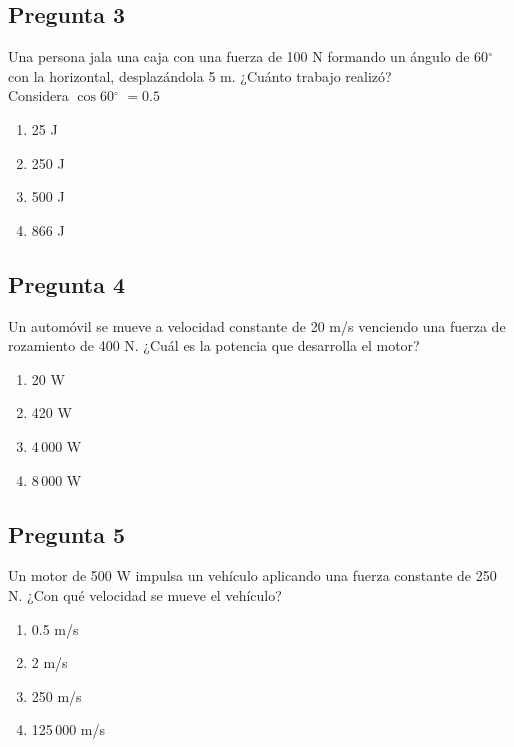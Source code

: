 \begin{preguntabox}
\subsection{Pregunta 3}
Una persona jala una caja con una fuerza de 100 N formando un ángulo de 60$^\circ$ con la horizontal, desplazándola 5 m. ¿Cuánto trabajo realizó?\\
Considera $\cos 60$$^\circ$ $= 0.5$

\begin{enumerate}
    \item[A)] 25 J
    \item[B)] 250 J
    \item[C)] 500 J
    \item[D)] 866 J
\end{enumerate}
\end{preguntabox}
\newpage
\begin{preguntabox}
\subsection{Pregunta 4}
Un automóvil se mueve a velocidad constante de 20 m/s venciendo una fuerza de rozamiento de 400 N. ¿Cuál es la potencia que desarrolla el motor?

\begin{enumerate}
    \item[A)] 20 W
    \item[B)] 420 W
    \item[C)] 4\,000 W
    \item[D)] 8\,000 W
\end{enumerate}
\end{preguntabox}


\begin{preguntabox}
\subsection{Pregunta 5}
Un motor de 500 W impulsa un vehículo aplicando una fuerza constante de 250 N. ¿Con qué velocidad se mueve el vehículo?

\begin{enumerate}
    \item[A)] 0.5 m/s
    \item[B)] 2 m/s
    \item[C)] 250 m/s
    \item[D)] 125\,000 m/s
\end{enumerate}
\end{preguntabox}

